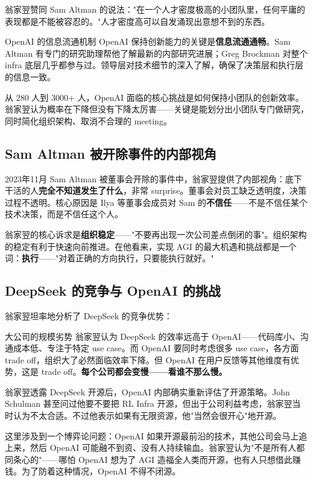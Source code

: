 \documentclass[a4paper]{article}
\begin{document}
翁家翌赞同 Sam Altman 的说法："在一个人才密度极高的小团队里，任何平庸的表现都是不能被容忍的。"人才密度高可以自发涌现出意想不到的东西。

\begin{knowledgebox}{OpenAI 的信息流通机制}
OpenAI 保持创新能力的关键是\textbf{信息流通通畅}。Sam Altman 有专门的研究助理帮他了解最新的内部研究进展；Greg Brockman 对整个 infra 底层几乎都参与过。领导层对技术细节的深入了解，确保了决策层和执行层的信息一致。
\end{knowledgebox}

从 280 人到 3000+ 人，OpenAI 面临的核心挑战是如何保持小团队的创新效率。翁家翌认为概率在下降但没有下降太厉害——关键是能划分出小团队专门做研究，同时简化组织架构、取消不合理的 meeting。

\subsection{Sam Altman 被开除事件的内部视角}

2023年11月 Sam Altman 被董事会开除的事件中，翁家翌提供了内部视角：底下干活的人\textbf{完全不知道发生了什么}，非常 surprise。董事会对员工缺乏透明度，决策过程不透明。核心原因是 Ilya 等董事会成员对 Sam 的\textbf{不信任}——不是不信任某个技术决策，而是不信任这个人。

翁家翌的核心诉求是\textbf{组织稳定}——"不要再出现一次公司差点倒闭的事"。组织架构的稳定有利于快速向前推进。在他看来，实现 AGI 的最大机遇和挑战都是一个词：\textbf{执行}——"对着正确的方向执行，只要能执行就好。"

\subsection{DeepSeek 的竞争与 OpenAI 的挑战}

翁家翌坦率地分析了 DeepSeek 的竞争优势：

\begin{warningbox}{大公司的规模劣势}
翁家翌认为 DeepSeek 的效率远高于 OpenAI——代码库小、沟通成本低、专注于特定 use case。而 OpenAI 要同时考虑很多 use case，各方面 trade off，组织大了必然面临效率下降。但 OpenAI 在用户反馈等其他维度有优势，这是 trade off。\textbf{每个公司都会变慢——看谁不那么慢。}
\end{warningbox}

翁家翌透露 DeepSeek 开源后，OpenAI 内部确实重新评估了开源策略。John Schulman 甚至问过他要不要把 RL Infra 开源，但出于公司利益考虑，翁家翌当时认为不太合适。不过他表示如果有无限资源，他"当然会很开心"地开源。

这里涉及到一个博弈论问题：OpenAI 如果开源最前沿的技术，其他公司会马上追上来，然后 OpenAI 可能融不到资、没有人持续输血。翁家翌认为"不是所有人都同条心的"——哪怕 OpenAI 想为了 AGI 造福全人类而开源，也有人只想借此赚钱。为了防着这种情况，OpenAI 不得不闭源。
\end{document}
